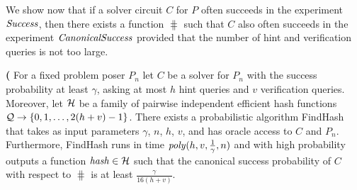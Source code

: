 We show now that if a solver circuit $C$ for $P$ often succeeds in the experiment $\operatorname{\mathit{Success}}$,
then there exists a function $\hash$ such that $C$ also often succeeds in the experiment $\operatorname{\mathit{CanonicalSuccess}}$
provided that the number of hint and verification queries is not too large.
%
\begin{lemma}\textbf{(}
\label{lemma:hash_function_probability}
For a fixed problem poser $P_n$ let $C$ be a solver for $P_n$ with the success probability at least $\gamma$,
asking at most $h$ hint queries and $v$ verification queries.
Moreover, let $\mathcal{H}$ be a family of pairwise independent efficient hash functions $\mathcal{Q} \rightarrow \{0,1, \dots,2(h+v)-1\}$.
There exists a probabilistic algorithm FindHash that takes as input parameters $\gamma$, $n$, $h$, $v$, and has oracle access to $C$ and $P_n$.
Furthermore, FindHash runs in time $\operatorname{\mathit{poly}}(h,v,\frac{1}{\gamma},n)$ and with high probability outputs a function $\operatorname{\mathit{hash}} \in \mathcal{H}$
such that the canonical success probability of $C$ with respect to $\hash$ is at least $\frac{\gamma}{16(h+v)}$.
\end{lemma}
%
